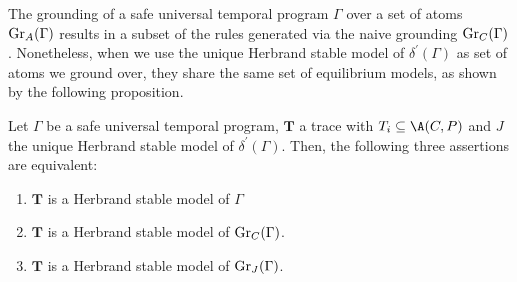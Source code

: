 The grounding of a safe universal temporal program $\Gamma$ over a set
of atoms $\operatorname{Gr}_{A}(\Gamma)$ results in a subset of the rules
generated via the naive grounding $\operatorname{Gr}_{C}(\Gamma)$. Nonetheless,
when we use the unique Herbrand stable model of
$\delta^{\prime}(\Gamma)$ as set of atoms we ground over, they share
the same set of equilibrium models, as shown by the following
proposition.

\begin{proposition}
  Let $\Gamma$ be a safe universal temporal program, $\bm{T}$ a trace
  with $T_i \subseteq \A(C,P)$ and $J$ the unique Herbrand stable
  model of $\delta^{\prime}(\Gamma)$. Then, the following three
  assertions are equivalent:
  \begin{enumerate}[label={(\arabic*)}]
    \setlength\itemsep{0.15em}
    \item $\bm{T}$ is a Herbrand stable model of $\Gamma$
    \item $\bm{T}$ is a Herbrand stable model of $\operatorname{Gr}_{C}(\Gamma)$.
    \item $\bm{T}$ is a Herbrand stable model of $\operatorname{Gr}_{J}(\Gamma)$.
  \end{enumerate}
\end{proposition}
